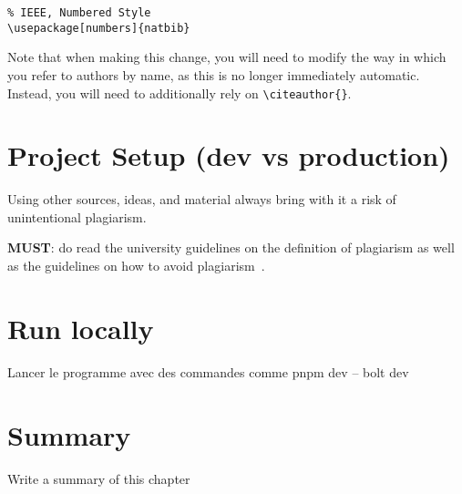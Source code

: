 \begin{verbatim}
% IEEE, Numbered Style
\usepackage[numbers]{natbib}

\end{verbatim}

Note that when making this change, you will need to modify the way in which you refer to authors by name, as this is no longer immediately automatic.  Instead, you will need to additionally rely on \verb|\citeauthor{}|.


\section{Project Setup (dev vs production)}
Using other sources, ideas, and material always bring with it a risk of unintentional plagiarism. 

\noindent
\textbf{\color{red}MUST}: do read the university guidelines on the definition of plagiarism as well as the guidelines on how to avoid plagiarism~\citep{uor_plagiarism}.




\section{Run locally} %
Lancer le programme avec des commandes comme pnpm dev -- bolt dev ~\\

\section{Summary} 
Write a summary of this chapter~\\
